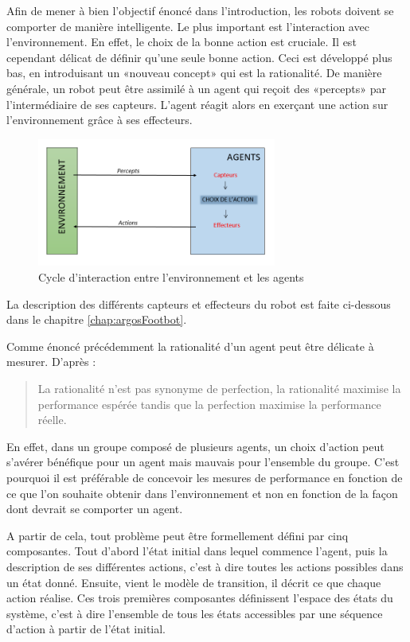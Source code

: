 \documentclass[a4paper,12pt]{report}
\begin{document}
Afin de mener à bien l'objectif énoncé dans l'introduction, les robots doivent se comporter de manière intelligente. Le plus important est l'interaction avec l'environnement. En effet, le choix de la bonne action est cruciale. Il est cependant délicat de définir qu'une seule bonne action. Ceci est développé plus bas, en introduisant un «nouveau concept» qui est la rationalité. 
De manière générale, un robot peut être assimilé à un agent qui reçoit des «percepts» par l'intermédiaire de ses capteurs. L'agent réagit alors en exerçant une action sur l'environnement grâce à ses effecteurs.
\begin{figure}[h!]
  \centering
  \includegraphics[width=0.7\textwidth]{cycleInteractionAI.png}
    \caption{Cycle d'interaction entre l'environnement et les agents}
\end{figure}
La description des différents capteurs et effecteurs du robot est faite ci-dessous dans le chapitre \ref{chap:argosFootbot}.

Comme énoncé précédemment la rationalité d'un agent peut être délicate à mesurer. D'après \cite{AIBrique}:
\begin{quote}
  \og{}La rationalité n'est pas synonyme de perfection, la rationalité maximise la performance espérée tandis que la perfection maximise la performance réelle.\fg{}
\end{quote}


En effet, dans un groupe composé de plusieurs agents, un choix d'action peut s'avérer bénéfique pour un agent mais mauvais pour l'ensemble du groupe. C'est pourquoi il est préférable de concevoir les mesures de performance en fonction de ce que l'on souhaite obtenir dans l'environnement et non en fonction de la façon dont devrait se comporter un agent.

A partir de cela, tout problème peut être formellement défini par cinq composantes. Tout d'abord l'état initial dans lequel commence l'agent, puis la description de ses différentes actions, c'est à dire toutes les actions possibles dans un état donné. Ensuite, vient le modèle de transition, il décrit ce que chaque action réalise. Ces trois premières composantes définissent l'espace des états du système, c'est à dire l'ensemble de tous les états accessibles par une séquence d'action à partir de l'état initial.
\end{document}
